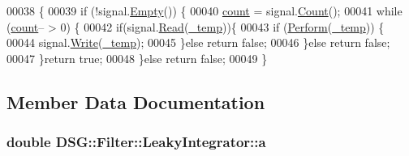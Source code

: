 \begin{DoxyCode}
00038                                                                           \{
00039             \textcolor{keywordflow}{if} (!signal.\hyperlink{class_d_s_g_1_1_ring_buffer_ac1346f5842d08b988a5297abe4089b96}{Empty}()) \{
00040                 \hyperlink{class_d_s_g_1_1_filter_1_1_filter_base_a74068413169f9acb3fcf8276074e3b1d}{count} = signal.\hyperlink{class_d_s_g_1_1_ring_buffer_a9bd79b0a6dff618b205e396c101ee070}{Count}();
00041                 \textcolor{keywordflow}{while} (\hyperlink{class_d_s_g_1_1_filter_1_1_filter_base_a74068413169f9acb3fcf8276074e3b1d}{count}-- > 0) \{
00042                     \textcolor{keywordflow}{if}(signal.\hyperlink{class_d_s_g_1_1_ring_buffer_a6b2848a64f15c7b0c320779582fa0fbe}{Read}(\hyperlink{class_d_s_g_1_1_filter_1_1_filter_base_a9e21e909fa2989adb88eedcb194e0150}{\_temp}))\{
00043                         \textcolor{keywordflow}{if} (\hyperlink{class_d_s_g_1_1_filter_1_1_leaky_integrator_a14ffd2f68de0cb9941d3295307ef13f0}{Perform}(\hyperlink{class_d_s_g_1_1_filter_1_1_filter_base_a9e21e909fa2989adb88eedcb194e0150}{\_temp})) \{
00044                             signal.\hyperlink{class_d_s_g_1_1_ring_buffer_aa5dd2caa0a270173251faee40a43d692}{Write}(\hyperlink{class_d_s_g_1_1_filter_1_1_filter_base_a9e21e909fa2989adb88eedcb194e0150}{\_temp});
00045                         \}\textcolor{keywordflow}{else} \textcolor{keywordflow}{return} \textcolor{keyword}{false};
00046                     \}\textcolor{keywordflow}{else} \textcolor{keywordflow}{return} \textcolor{keyword}{false};
00047                 \}\textcolor{keywordflow}{return} \textcolor{keyword}{true};
00048             \}\textcolor{keywordflow}{else} \textcolor{keywordflow}{return} \textcolor{keyword}{false};
00049         \}
\end{DoxyCode}


\subsection{Member Data Documentation}
\hypertarget{class_d_s_g_1_1_filter_1_1_leaky_integrator_a9a321b7650923119fda60595a7659aef}{
\subsubsection[{a}]{\setlength{\rightskip}{0pt plus 5cm}double D\+S\+G\+::\+Filter\+::\+Leaky\+Integrator\+::a\hspace{0.3cm}{\ttfamily [protected]}}}\label{class_d_s_g_1_1_filter_1_1_leaky_integrator_a9a321b7650923119fda60595a7659aef}


